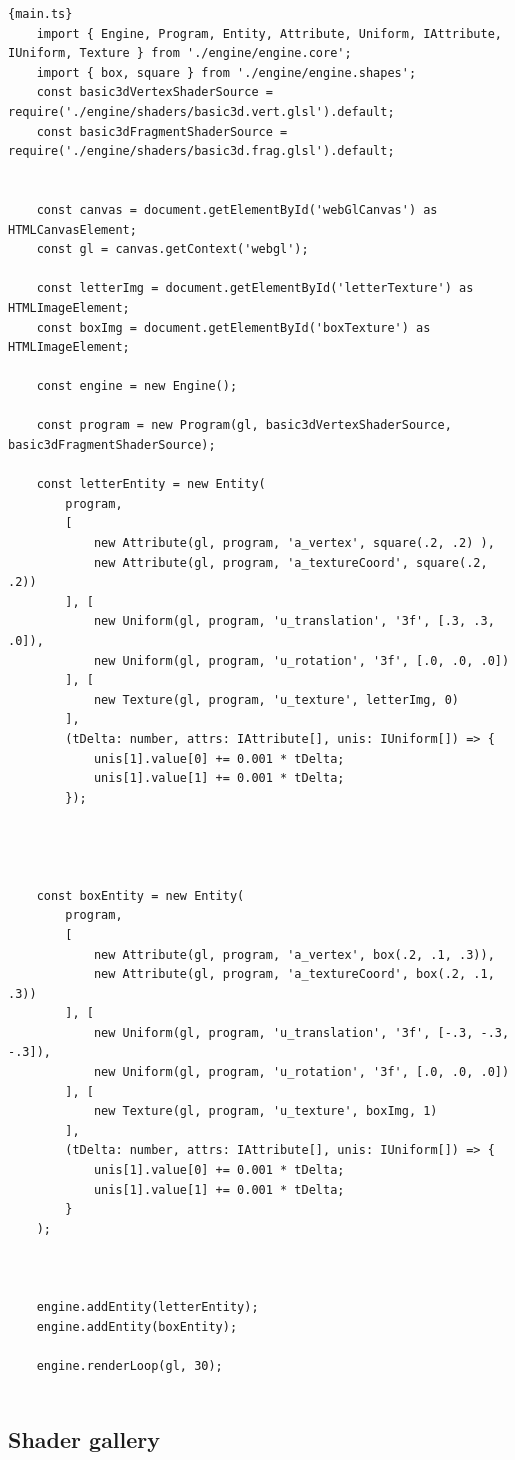 \begin{lstlisting}{main.ts}
    import { Engine, Program, Entity, Attribute, Uniform, IAttribute, IUniform, Texture } from './engine/engine.core';
    import { box, square } from './engine/engine.shapes';
    const basic3dVertexShaderSource = require('./engine/shaders/basic3d.vert.glsl').default;
    const basic3dFragmentShaderSource = require('./engine/shaders/basic3d.frag.glsl').default;
    
    
    const canvas = document.getElementById('webGlCanvas') as HTMLCanvasElement;
    const gl = canvas.getContext('webgl');
    
    const letterImg = document.getElementById('letterTexture') as HTMLImageElement;
    const boxImg = document.getElementById('boxTexture') as HTMLImageElement;
    
    const engine = new Engine();
    
    const program = new Program(gl, basic3dVertexShaderSource, basic3dFragmentShaderSource);
    
    const letterEntity = new Entity(
        program,
        [
            new Attribute(gl, program, 'a_vertex', square(.2, .2) ),
            new Attribute(gl, program, 'a_textureCoord', square(.2, .2))
        ], [
            new Uniform(gl, program, 'u_translation', '3f', [.3, .3, .0]),
            new Uniform(gl, program, 'u_rotation', '3f', [.0, .0, .0])
        ], [
            new Texture(gl, program, 'u_texture', letterImg, 0)
        ],
        (tDelta: number, attrs: IAttribute[], unis: IUniform[]) => {
            unis[1].value[0] += 0.001 * tDelta;
            unis[1].value[1] += 0.001 * tDelta;
        });
    
    
    
    
    const boxEntity = new Entity(
        program,
        [
            new Attribute(gl, program, 'a_vertex', box(.2, .1, .3)),
            new Attribute(gl, program, 'a_textureCoord', box(.2, .1, .3))
        ], [
            new Uniform(gl, program, 'u_translation', '3f', [-.3, -.3, -.3]),
            new Uniform(gl, program, 'u_rotation', '3f', [.0, .0, .0])
        ], [
            new Texture(gl, program, 'u_texture', boxImg, 1)
        ],
        (tDelta: number, attrs: IAttribute[], unis: IUniform[]) => {
            unis[1].value[0] += 0.001 * tDelta;
            unis[1].value[1] += 0.001 * tDelta;
        }
    );
    
    
    
    engine.addEntity(letterEntity);
    engine.addEntity(boxEntity);
    
    engine.renderLoop(gl, 30);
    
\end{lstlisting}

\subsection{Shader gallery}


